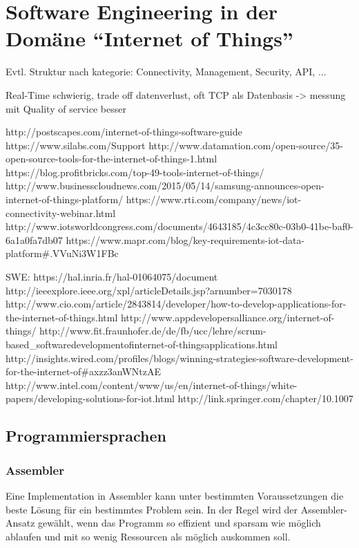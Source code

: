 \chapter{Software Engineering in der Domäne "`Internet of Things"'}


Evtl. Struktur nach kategorie: Connectivity, Management, Security, API, ...

Real-Time schwierig, trade off datenverlust, oft TCP als Datenbasis -> messung mit Quality of service besser

http://postscapes.com/internet-of-things-software-guide
https://www.silabs.com/Support%
http://www.datamation.com/open-source/35-open-source-tools-for-the-internet-of-things-1.html
https://blog.profitbricks.com/top-49-tools-internet-of-things/
http://www.businesscloudnews.com/2015/05/14/samsung-announces-open-internet-of-things-platform/
https://www.rti.com/company/news/iot-connectivity-webinar.html
http://www.iotsworldcongress.com/documents/4643185/4c3cc80c-03b0-41be-baf0-6a1a0fa7db07
https://www.mapr.com/blog/key-requirements-iot-data-platform#.VVuNi3W1FBc


SWE:
https://hal.inria.fr/hal-01064075/document
http://ieeexplore.ieee.org/xpl/articleDetails.jsp?arnumber=7030178
http://www.cio.com/article/2843814/developer/how-to-develop-applications-for-the-internet-of-things.html
http://www.appdevelopersalliance.org/internet-of-things/
http://www.fit.fraunhofer.de/de/fb/ucc/lehre/scrum-based_softwaredevelopmentofinternet-of-thingsapplications.html
http://insights.wired.com/profiles/blogs/winning-strategies-software-development-for-the-internet-of#axzz3anWNtzAE
http://www.intel.com/content/www/us/en/internet-of-things/white-papers/developing-solutions-for-iot.html
http://link.springer.com/chapter/10.1007%

\section{Programmiersprachen}

\subsection{Assembler}
Eine Implementation in Assembler kann unter bestimmten Voraussetzungen die beste Lösung für ein bestimmtes Problem sein. In der Regel wird der Assembler-Ansatz gewählt, wenn das Programm so effizient und sparsam wie möglich ablaufen und mit so wenig Ressourcen als möglich auskommen soll.



